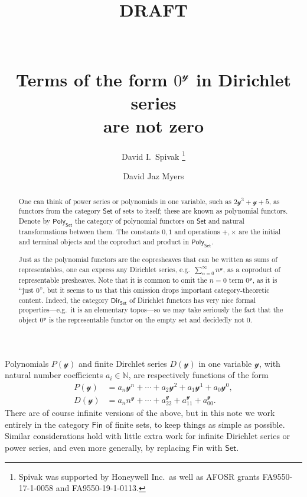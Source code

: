 \documentclass[11pt, article, one side]{memoir}
\theoremstyle{theorem}
\theoremstyle{definition}
\theoremstyle{remark}
\newcommand{\cat}[1]{\mathcal{#1}}%
\newcommand{\Cat}[1]{\mathsf{#1}}%
\newcommand{\nn}{\mathbb{N}}
\newcommand{\smset}{\Cat{Set}}
\newcommand{\finset}{\Cat{Fin}}
\newcommand{\yon}{\mathcal{y}}
\newcommand{\poly}{\Cat{Poly}}
\newcommand{\dir}{\Cat{Dir}}
\begin{document}
\title{DRAFT\\~\\~\\Terms of the form $0^\yon$ in Dirichlet series\\are not zero}

\author{David I.\ Spivak%
\thanks{Spivak was supported by Honeywell Inc.\ as well as AFOSR grants FA9550-17-1-0058 and FA9550-19-1-0113.}
\and David Jaz Myers%
}

\maketitle
\begin{abstract}
One can think of power series or polynomials in one variable, such as $2\yon^3+\yon+5$, as functors from the category $\smset$ of sets to itself; these are known as polynomial functors. Denote by $\poly_\smset$ the category of polynomial functors on $\smset$ and natural transformations between them. The constants $0,1$ and operations $+,\times$ are the initial and terminal objects and the coproduct and product in $\poly_\smset$. 

Just as the polynomial functors are the copresheaves that can be written as sums of representables, one can express any Dirichlet series, e.g.\ $\sum_{n=0}^\infty n^\yon$, as a coproduct of representable presheaves. Note that it is common to omit the $n=0$ term $0^\yon$, as it is ``just 0'', but it seems to us that this omission drops important category-theoretic content. Indeed, the category $\dir_\smset$ of Dirichlet functors has very nice formal properties---e.g.\ it is an elementary topos---so we may take seriously the fact that the object $0^\yon$ is the representable functor on the empty set and decidedly not $0$.

\end{abstract}

Polynomials $P(\yon)$ and finite Dirchlet series $D(\yon)$ in one variable $\cat{y}$, with natural number coefficients $a_i\in\nn$, are respectively functions of the form
\begin{equation}\label{eqn.poly_dir_simple}
\begin{aligned}
  P(\yon)&=a_n\yon^n+\cdots+a_2\yon^2+a_1\yon^1+a_0\yon^0,\\
  D(\yon)&=a_n n^\yon+\cdots+a_22^\yon+a_11^\yon+a_00^\yon.
\end{aligned}
\end{equation}
There are of course infinite versions of the above, but in this note we work entirely in the category $\finset$ of finite sets, to keep things as simple as possible. Similar considerations hold with little extra work for infinite Dirichlet series or power series, and even more generally, by replacing $\finset$ with $\smset$.
\end{document}
